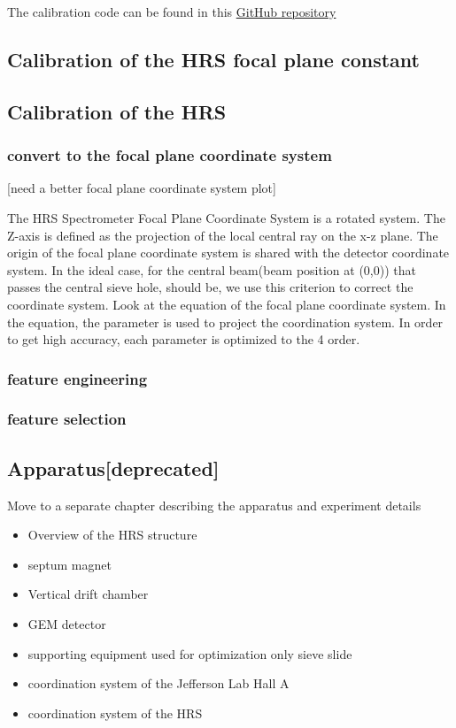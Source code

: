 The calibration code can be found in this \hyperlink{https://github.com/Jiansiyu/GeneralScripts/tree/master/VDC_T0_Cali}{GitHub repository}  

\subsection{Calibration of the HRS focal plane constant}

\subsection{Calibration of the HRS}

\subsubsection{convert to the focal plane coordinate system}

[need a better focal plane coordinate system plot]

The HRS Spectrometer Focal Plane Coordinate System is a rotated system. The Z-axis is defined as the projection of the local central ray on the x-z plane. The origin of the focal plane coordinate system is shared with the detector coordinate system. In the ideal case, for the central beam(beam position at (0,0)) that passes the central sieve hole,  should be, we use this criterion to correct the coordinate system. Look at the equation of the focal plane coordinate system. In the equation, the parameter is used to project the coordination system. In order to get high accuracy, each parameter is optimized to the 4 order. 

\subsubsection{feature engineering} 
\subsubsection{feature selection}
\subsection{Apparatus[deprecated]}

Move to a separate chapter describing the apparatus and experiment details

\begin{itemize}
    \item Overview of the HRS structure
    \item septum magnet 
    \item Vertical drift chamber 
    \item GEM detector
    \item supporting equipment used for optimization only sieve slide

    \item coordination system of the Jefferson Lab Hall A
    \item coordination system of the HRS
\end{itemize}


